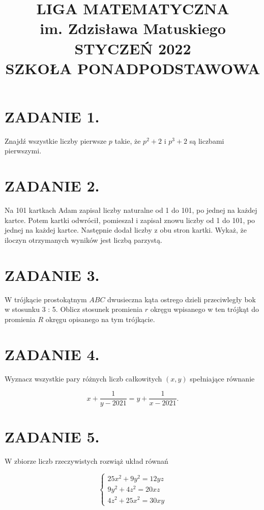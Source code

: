 \documentclass[10pt]{article}
\title{LIGA MATEMATYCZNA \\
 im. Zdzisława Matuskiego \\
 STYCZEŃ 2022 \\
 SZKOŁA PONADPODSTAWOWA }
\author{}
\date{}
\begin{document}
\maketitle
\section*{ZADANIE 1.}
Znajdź wszystkie liczby pierwsze \(p\) takie, że \(p^{2}+2\) i \(p^{3}+2\) są liczbami pierwszymi.

\section*{ZADANIE 2.}
Na 101 kartkach Adam zapisał liczby naturalne od 1 do 101, po jednej na każdej kartce. Potem kartki odwrócił, pomieszał i zapisał znowu liczby od 1 do 101, po jednej na każdej kartce. Następnie dodał liczby z obu stron kartki. Wykaż, że iloczyn otrzymanych wyników jest liczbą parzystą.

\section*{ZADANIE 3.}
W trójkącie prostokątnym \(A B C\) dwusieczna kąta ostrego dzieli przeciwległy bok w stosunku 3 : 5. Oblicz stosunek promienia \(r\) okręgu wpisanego w ten trójkąt do promienia \(R\) okręgu opisanego na tym trójkącie.

\section*{ZADANIE 4.}
Wyznacz wszystkie pary różnych liczb całkowitych \((x, y)\) spełniające równanie

\[
x+\frac{1}{y-2021}=y+\frac{1}{x-2021} .
\]

\section*{ZADANIE 5.}
W zbiorze liczb rzeczywistych rozwiąż układ równań

\[
\left\{\begin{array}{l}
25 x^{2}+9 y^{2}=12 y z \\
9 y^{2}+4 z^{2}=20 x z \\
4 z^{2}+25 x^{2}=30 x y
\end{array}\right.
\]
\end{document}
